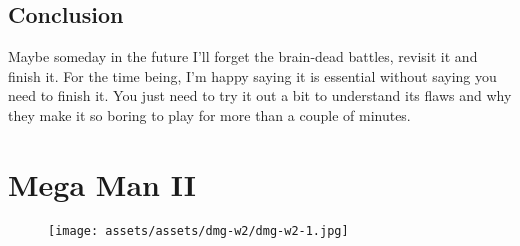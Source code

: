 \documentclass{book}
\begin{document}
\FloatBarrier\needspace{10mm}\section*{Conclusion}\nopagebreak[4]

Maybe someday in the future I’ll forget the brain-dead battles, revisit it and finish it. For the time being, I’m happy saying it is essential without saying you need to finish it. You just need to try it out a bit to understand its flaws and why they make it so boring to play for more than a couple of minutes.



\begingroup \chapter*{Mega Man II} \endgroup
\begin{figure}[H]
\vskip 4pt
\centering
\texttt{[image: assets/assets/dmg-w2/dmg-w2-1.jpg]}\end{figure}
\end{document}

